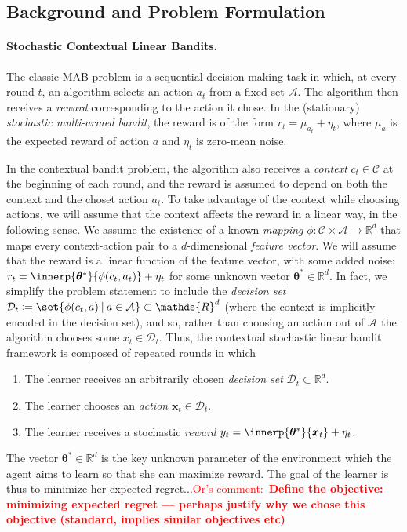\documentclass{article}
\newcommand{\os}[1]{\textcolor{red}{Or's comment:~\textbf{#1}}}
\renewcommand{\vec}[1]{\bm{#1}}
\newcommand{\defeq}{\coloneq}
\newcommand{\Real}{\mathds{R}}
\newcommand\given[1][\delimsize]{%
  \providecommand{\delimsize}{}
  \nonscript\:#1\vert\allowbreak\nonscript\:\mathopen{}
}
\newcommand{\A}{\mathcal{A}}
\newcommand{\C}{\mathcal{C}}
\newcommand{\Aset}[1]{\mathcal{A}_{#1}}
\newcommand{\Dset}[1]{\mathcal{D}_{#1}}
\newcommand{\Cset}[1]{\mathcal{C}_{#1}}
\begin{document}
\subsection{Background and Problem Formulation}
\label{subsec:intro_background}

\paragraph{Stochastic Contextual Linear Bandits.}
The classic MAB problem is a sequential decision making task in which, at
every round $t$, an algorithm selects an action $a_t$ from a fixed set $\A$.
The algorithm then receives a \emph{reward}
corresponding to the action it chose.  In the (stationary)
\emph{stochastic multi-armed bandit}, the reward is of the form $r_t =
\mu_{a_t} + \eta_t$, where $\mu_a$ is the expected reward of action $a$
and $\eta_t$ is zero-mean noise.

In the contextual bandit problem, the algorithm also receives a
\emph{context} $c_t\in\C$ at the beginning of each round, and the
reward is assumed to depend on both the context and the choset action $a_t$.  To
take advantage of the context while choosing actions, we will assume
that the context affects the reward in a linear way, in the following
sense.  We assume the existence of a known \emph{mapping}
$\phi:\Cset{}\times\Aset{}\to\Real^d$ that maps every context-action
pair to a $d$-dimensional \emph{feature vector}.  We will assume that
the reward is a linear function of the feature vector, with some added
noise: $r_t = \innerp{\vec\theta^*}{\phi(c_t,a_t)} + \eta_t$ for some
unknown vector $\vec\theta^*\in\Real^d$. In fact, we simplify the
problem statement to include the \emph{decision set}
$\Dset{t} \defeq \set{\phi(c_t,a)\given a\in\Aset{}} \subset \Real^d$
(where the context is implicitly encoded in the decision set), and so,
rather than choosing an action out of $\Aset{}$ the algorithm chooses
some $x_t\in\Dset{t}$.  Thus, the contextual stochastic linear bandit
framework is composed of repeated rounds in which
\begin{enumerate}
\item The learner receives an arbitrarily chosen \emph{decision set} $\mathcal{D}_t \subset
  \Real^d$.
\item The learner chooses an \emph{action} $\vec x_t \in \mathcal{D}_t$.
\item The learner receives a stochastic \emph{reward}
  $y_t = \innerp{\vec\theta^*}{\vec x_t} + \eta_t$.
\end{enumerate}
The vector $\vec\theta^*\in\Real^d$ is the key unknown parameter of the
environment which the agent aims to learn so that she can maximize reward. The goal of the learner is thus to minimize her expected regret...\os{Define the objective: minimizing expected regret --- perhaps justify why we chose this objective (standard, implies similar objectives etc)}
\end{document}
